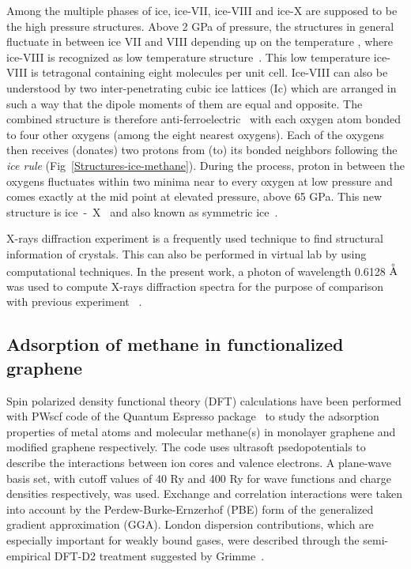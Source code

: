 Among the multiple phases of ice, ice-VII, ice-VIII and ice-X are supposed to be the high pressure structures. Above 2 GPa of pressure, the structures in general fluctuate in between ice VII and VIII depending up on the temperature \citep{Wolanin1997}, where ice-VIII is recognized as low temperature structure~\citep{Yamawaki2004}. This low temperature ice-VIII is tetragonal containing eight molecules per unit cell. Ice-VIII can also be understood by two inter-penetrating cubic ice lattices (Ic) which are arranged in such a way that the dipole moments of them are equal and opposite. The combined structure is therefore anti-ferroelectric~\citep{Goncharov1996} with each oxygen atom bonded to four other oxygens (among the eight nearest oxygens). Each of the oxygens then receives (donates) two protons from (to) its bonded neighbors following the {\it ice rule} (Fig~\ref{Structures-ice-methane}). During the process, proton in between the oxygens fluctuates within two minima near to every oxygen at low pressure and comes exactly at the mid point at elevated pressure, above 65 GPa. This new structure is ice~-~X~ and also known as symmetric ice~\citep{Loubeyre1999}. 

X-rays diffraction experiment is a frequently used technique to find structural information of crystals. This can also be performed in virtual lab by using computational techniques. In the present work, a photon of wavelength 0.6128 $\buildrel _\circ \over {\mathrm{A}}$ was used to compute X-rays diffraction spectra for the purpose of comparison with previous experiment ~\citep{Machida2006}. 
\subsection{Adsorption of methane in functionalized graphene}
\label{Adatom-graphene-meth}
\begin{sloppypar}
Spin polarized density functional theory (DFT) calculations \citep{Hohenberg1964, Kohn1965} have been performed with PWscf code of the Quantum Espresso package~\citep{Giannozzi2009} to study the adsorption properties of metal atoms and molecular methane(s) in monolayer graphene and modified graphene respectively. The code uses ultrasoft psedopotentials to describe the interactions between ion cores and valence electrons. A plane-wave basis set, with cutoff values of 40 Ry and 400 Ry for wave functions and charge densities respectively, was used. Exchange and correlation interactions were taken into account by the Perdew-Burke-Ernzerhof (PBE) \citep{Perdew1996} form of the generalized gradient approximation (GGA). London dispersion contributions, which are especially important for
weakly bound gases, were described through the semi-empirical DFT-D2 treatment suggested by Grimme~\citep{Grimme2004, Grimme2006}.  
\end{sloppypar}

